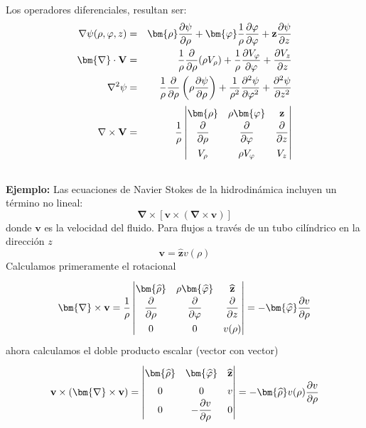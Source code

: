 Los operadores diferenciales, resultan ser:
\begin{eqnarray}
\nabla \psi (\rho, \varphi, z) &=& \bm{\rho} \dfrac{\partial \psi}{\partial \rho} + \bm{\varphi} \dfrac{1}{\rho} \dfrac{\partial \varphi}{\partial \varphi} + \mathbf{z} \dfrac{\partial \psi}{\partial z} \\
\bm{\nabla} \cdot \mathbf{V} &=& \dfrac{1}{\rho} \dfrac{\partial}{\partial \rho} (\rho V_{\rho}) + \dfrac{1}{\rho} \dfrac{\partial V_{\varphi}}{\partial \varphi} + \dfrac{\partial V_{z}}{\partial z} \\
\nabla^{2} \psi &=& \dfrac{1}{\rho} \dfrac{\partial}{\partial \rho} \left( \rho \dfrac{\partial \psi}{\partial \rho} \right) + \dfrac{1}{\rho^{2}} \dfrac{\partial^{2} \psi}{\partial \varphi^{2}} + \dfrac{\partial^{2} \psi}{\partial z^{2}} \\
\mathbf{\nabla} \times \mathbf{V} &=& \dfrac{1}{\rho} 
\renewcommand\arraystretch{1.5} \begin{vmatrix}
\bm{\rho} & \rho \bm{\varphi} & \mathbf{z} \\
\dfrac{\partial}{\partial \rho} & \dfrac{\partial}{\partial \varphi} & \dfrac{\partial}{\partial z} \\
V_{\rho} & \rho V_{\varphi} & V_{z}
\end{vmatrix}
\end{eqnarray}
\\
\textbf{Ejemplo: } Las ecuaciones de Navier Stokes de la hidrodinámica incluyen un término no lineal:
\[ \bm{\nabla} \times [ \mathbf{v} \times ( \bm{\nabla} \times \mathbf{v})] \]
donde $\mathbf{v}$ es la velocidad del fluido. Para flujos a través de un tubo cilíndrico en la dirección $z$
\[ \mathbf{v} =  \mathbf{\widehat{z}} v (\rho) \]
Calculamos primeramente el rotacional
\[ \bm{\nabla} \times \mathbf{v} = \dfrac{1}{\rho} \left| 
\renewcommand\arraystretch{1.5} \begin{matrix}
\bm{\widehat{\rho}} & \rho \bm{\widehat{\varphi}} & \mathbf{\widehat{z}} \\
\dfrac{\partial}{\partial \rho} & \dfrac{\partial}{\partial \varphi} & \dfrac{\partial}{\partial z} \\
0 & 0 & v(\rho)\end{matrix} \right| = - \bm{\widehat{\varphi}} \dfrac{\partial v}{\partial \rho} \]
ahora calculamos el doble producto escalar (vector con vector)
\[ \mathbf{v} \times (\bm{\nabla} \times \mathbf{v}) = \left| 
\renewcommand\arraystretch{1.5} \begin{matrix}
\bm{\widehat{\rho}} & \bm{\widehat{\varphi}} & \mathbf{\widehat{z}} \\
0 & 0 & v \\
0 & - \dfrac{\partial v}{\partial \rho} & 0\end{matrix} \right| = - \bm{\widehat{\rho}} v(\rho) \dfrac{\partial v}{\partial \rho} \] 
